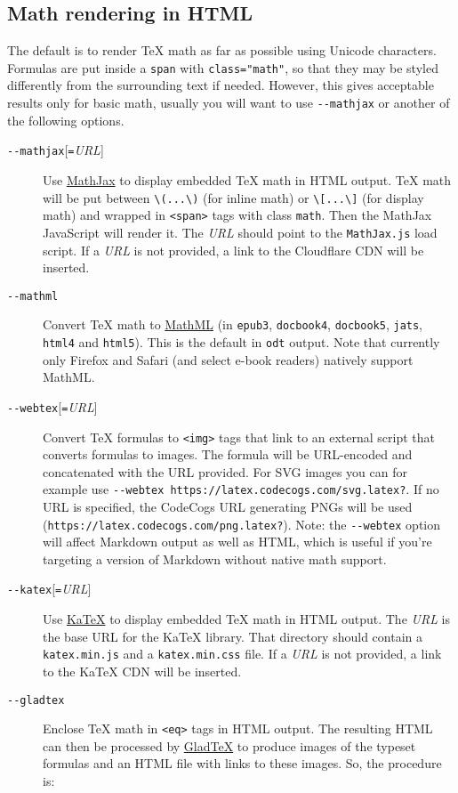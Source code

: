 \documentclass[]{article}
\begin{document}
\hypertarget{math-rendering-in-html}{%
\subsection{Math rendering in HTML}\label{math-rendering-in-html}}

The default is to render TeX math as far as possible using Unicode
characters. Formulas are put inside a \texttt{span} with
\texttt{class="math"}, so that they may be styled differently from the
surrounding text if needed. However, this gives acceptable results only
for basic math, usually you will want to use \texttt{-\/-mathjax} or
another of the following options.

\begin{description}
\item[\texttt{-\/-mathjax}{[}\texttt{=}\emph{URL}{]}]
Use \href{https://www.mathjax.org}{MathJax} to display embedded TeX math
in HTML output. TeX math will be put between
\texttt{\textbackslash{}(...\textbackslash{})} (for inline math) or
\texttt{\textbackslash{}{[}...\textbackslash{}{]}} (for display math)
and wrapped in \texttt{\textless{}span\textgreater{}} tags with class
\texttt{math}. Then the MathJax JavaScript will render it. The
\emph{URL} should point to the \texttt{MathJax.js} load script. If a
\emph{URL} is not provided, a link to the Cloudflare CDN will be
inserted.
\item[\texttt{-\/-mathml}]
Convert TeX math to \href{https://www.w3.org/Math/}{MathML} (in
\texttt{epub3}, \texttt{docbook4}, \texttt{docbook5}, \texttt{jats},
\texttt{html4} and \texttt{html5}). This is the default in \texttt{odt}
output. Note that currently only Firefox and Safari (and select e-book
readers) natively support MathML.
\item[\texttt{-\/-webtex}{[}\texttt{=}\emph{URL}{]}]
Convert TeX formulas to \texttt{\textless{}img\textgreater{}} tags that
link to an external script that converts formulas to images. The formula
will be URL-encoded and concatenated with the URL provided. For SVG
images you can for example use
\texttt{-\/-webtex\ https://latex.codecogs.com/svg.latex?}. If no URL is
specified, the CodeCogs URL generating PNGs will be used
(\texttt{https://latex.codecogs.com/png.latex?}). Note: the
\texttt{-\/-webtex} option will affect Markdown output as well as HTML,
which is useful if you're targeting a version of Markdown without native
math support.
\item[\texttt{-\/-katex}{[}\texttt{=}\emph{URL}{]}]
Use \href{https://github.com/Khan/KaTeX}{KaTeX} to display embedded TeX
math in HTML output. The \emph{URL} is the base URL for the KaTeX
library. That directory should contain a \texttt{katex.min.js} and a
\texttt{katex.min.css} file. If a \emph{URL} is not provided, a link to
the KaTeX CDN will be inserted.
\item[\texttt{-\/-gladtex}]
Enclose TeX math in \texttt{\textless{}eq\textgreater{}} tags in HTML
output. The resulting HTML can then be processed by
\href{https://humenda.github.io/GladTeX/}{GladTeX} to produce images of
the typeset formulas and an HTML file with links to these images. So,
the procedure is:


\end{description}
\end{document}
